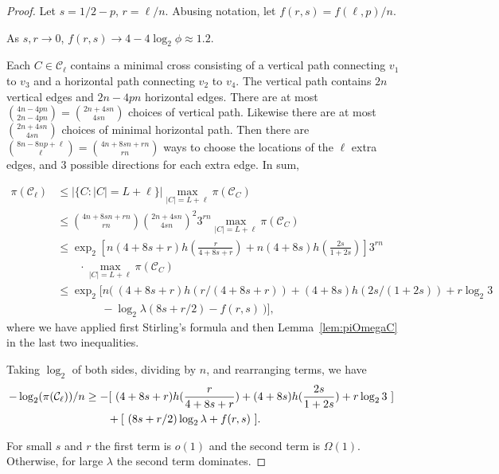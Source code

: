 \documentclass[10pt,a4paper]{amsart}
\newcommand{\cC}{\mathcal{C}}
\begin{document}
\begin{proof}
Let $s = 1/2 - p$, $r = \ell/n$. Abusing notation, let $f(r, s) = f(\ell, p)/n$.

As $s, r \rightarrow 0$, $f(r, s) \rightarrow 4 - 4\log_2\phi \approx 1.2$.

Each $C \in \cC_{\ell}$ contains a minimal cross consisting of a vertical path connecting $v_1$ to $v_3$ and a horizontal path connecting $v_2$ to $v_4$. 
The vertical path contains $2n$ vertical edges and $2n-4pn$ horizontal edges. 
There are at most $\binom{4n-4pn}{2n-4pn} = \binom{2n+4sn}{4sn}$ choices of  vertical path.  
Likewise there are at most $\binom{2n+4sn}{4sn}$ choices of minimal horizontal path.  
Then there are $\binom{8n-8np+\ell}{\ell} = \binom{4n+8sn+rn}{rn}$ ways to choose the locations of the $\ell$ extra edges, and $3$ possible directions for each extra edge. In sum,

\begin{align*}
\pi(\cC_{\ell}) & \leq | \{C : |C| = L + \ell \}| \max_{|C| = L + \ell} \pi(\cC_C ) \\
      & \leq \binom{4n+8sn+rn}{rn} \binom{2n+4sn}{4sn}^2 3^{rn} 
      \max_{|C| = L + \ell} \pi(\cC_C ) \\
      & \leq \exp_2\left[n(4+8s+r)h\left(\frac{r}{4+8s+r}\right) + n(4+8s)h\left(\frac{2s}{1 + 2s}\right)\right] 3^{rn} \\
      &  \qquad \cdot \max_{|C| = L + \ell} \pi(\cC_C ) \\
      & \leq \exp_2[n(~ (4+8s+r)h(r/(4+8s+r)) + (4+8s)h(2s/(1 + 2s)) + r\log_2 3  \\
      & \qquad\qquad  - \log_2\lambda(8s + r/2) - f(r, s)~)] ,
\end{align*}
where we have applied first Stirling's formula and then Lemma~\ref{lem:piOmegaC} in the last two inequalities.

Taking $\log_2$ of both sides, dividing by $n$, and rearranging terms, we have
\begin{align*}
- \log_2(\pi(\cC_{\ell}))/n & \geq  
                -[~(4+8s+r)h(\frac{r}{4+8s+r}) + (4+8s)h(\frac{2s}{1+2s}) + r \log_2 3 ~] \cr
				     & \qquad + [~ (8s+ r/2) \log_2 \lambda + f(r, s) ~] .
\end{align*}

For small $s$ and $r$ the first term is $o(1)$ and the second term is $\Omega(1)$. Otherwise, for large $\lambda$ the second term dominates.
\end{proof}
\end{document}
